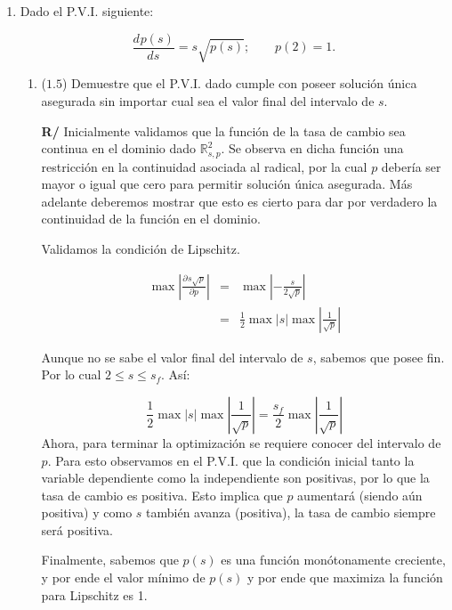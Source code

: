 \documentclass[12pt]{article}
\newcommand{\R}{\ensuremath{\mathbb{R}}}
\newcommand{\diff}[3]{\frac{d^{#3} #1}{d#2^{#3}}}
\newcommand{\pdiff}[3]{\frac{\partial^{#3} #1}{\partial#2^{#3}}}
\begin{document}
\vspace{-.5cm}
  \begin{enumerate}[leftmargin=*,widest=9]

    \item Dado el P.V.I. siguiente:

    \[
      \diff{p(s)}{s}{} = s\sqrt{p(s)};\qquad
      p(2) = 1.
    \]

    \begin{enumerate}[label=\alph*]
    \item (\(1.5\)) Demuestre que el P.V.I. dado cumple con poseer solución única asegurada sin importar cual sea el valor final del intervalo de \(s\).

    \textbf{R/} Inicialmente validamos que la función de la tasa de cambio sea continua en el dominio dado \(\R^2_{s,p}\). Se observa en dicha función una restricción en la continuidad asociada al radical, por la cual \(p\) debería ser mayor o igual que cero para permitir solución única asegurada. Más adelante deberemos mostrar que esto es cierto para dar por verdadero la continuidad de la función en el dominio.

    Validamos la condición de Lipschitz.

    \begin{eqnarray*}
\max \left\vert \pdiff{s\sqrt{p}}{p}{} \right\vert &= &\max \left\vert -\frac{s}{2\sqrt{p}}\right\vert\\
& = & \frac{1}{2}\max \vert s\vert \max \left\vert \frac{1}{\sqrt{p}} \right\vert
    \end{eqnarray*}

    Aunque no se sabe el valor final del intervalo de \(s\), sabemos que posee fin. Por lo cual \(2 \leq s \leq s_f\). Así:

    \[
\frac{1}{2}\max \vert s\vert \max \left\vert \frac{1}{\sqrt{p}} \right\vert = \frac{s_f}{2}\max\left\vert \frac{1}{\sqrt{p}} \right\vert
    \]
Ahora, para terminar la optimización se requiere conocer del intervalo de \(p\). Para esto observamos en el P.V.I. que la condición inicial tanto la variable dependiente como la independiente son positivas, por lo que la tasa de cambio es positiva. Esto implica que \(p\) aumentará (siendo aún positiva) y como \(s\) también avanza (positiva), la tasa de cambio siempre será positiva.

Finalmente, sabemos que \(p(s)\) es una función monótonamente creciente, y por ende el valor mínimo de \(p(s)\) y por ende que maximiza la función para Lipschitz es 1.


\end{enumerate}
\end{enumerate}
\end{document}
